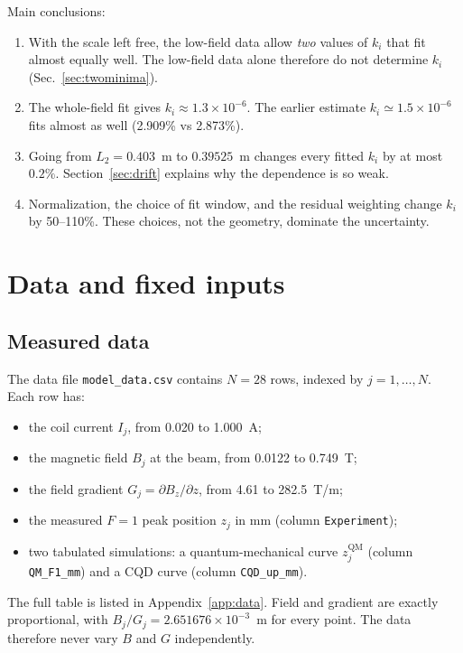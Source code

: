 \documentclass[11pt,a4paper]{article}
\newcommand{\QM}{\mathrm{QM}}
\begin{document}
\noindent Main conclusions:
\begin{enumerate}
\item With the scale left free, the low-field data allow \emph{two} values of $k_i$ that fit almost equally well. The low-field data alone therefore do not determine $k_i$ (Sec.~\ref{sec:twominima}).
\item The whole-field fit gives $k_i \approx 1.3\times10^{-6}$. The earlier estimate $k_i \simeq 1.5\times10^{-6}$ fits almost as well (2.909\% vs 2.873\%).
\item Going from $L_2 = 0.403$~m to $0.39525$~m changes every fitted $k_i$ by at most $0.2\%$. Section~\ref{sec:drift} explains why the dependence is so weak.
\item Normalization, the choice of fit window, and the residual weighting change $k_i$ by 50--110\%. These choices, not the geometry, dominate the uncertainty.
\end{enumerate}

\section{Data and fixed inputs}

\subsection{Measured data}
The data file \texttt{model\_data.csv} contains $N=28$ rows, indexed by $j=1,\dots,N$. Each row has:
\begin{itemize}
\item the coil current $I_j$, from 0.020 to 1.000~A;
\item the magnetic field $B_j$ at the beam, from 0.0122 to 0.749~T;
\item the field gradient $G_j = \partial B_z/\partial z$, from 4.61 to 282.5~T/m;
\item the measured $F=1$ peak position $z_j$ in mm (column \texttt{Experiment});
\item two tabulated simulations: a quantum-mechanical curve $z_j^{\QM}$ (column \texttt{QM\_F1\_mm}) and a CQD curve (column \texttt{CQD\_up\_mm}).
\end{itemize}
The full table is listed in Appendix~\ref{app:data}. Field and gradient are exactly proportional, with $B_j/G_j = 2.651676\times10^{-3}$~m for every point. The data therefore never vary $B$ and $G$ independently.
\end{document}
